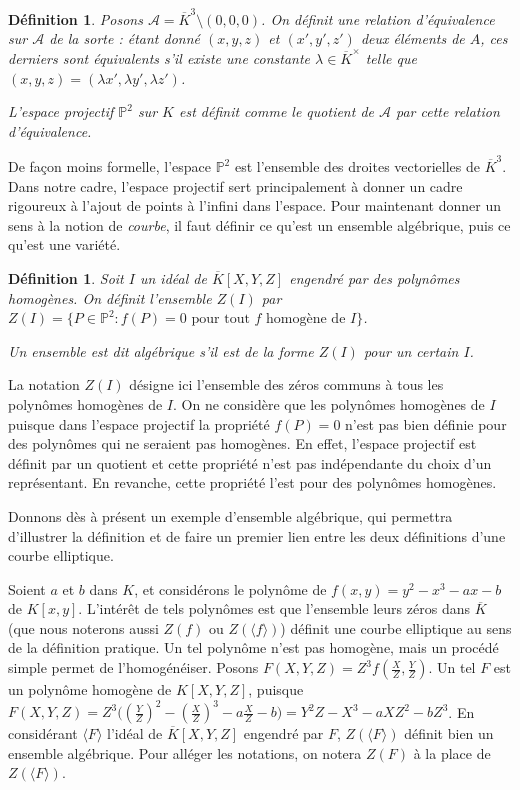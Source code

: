 \documentclass{article}
\theoremstyle{plain}%
\newtheorem{deff}[thm]{Définition}
\theoremstyle{definition}%
\newcommand{\ol}{\overline}
\begin{document}
\begin{deff}
  Posons $\mathcal{A} = \ol K^3\setminus(0, 0, 0)$. On définit une relation d'équivalence sur $\mathcal A$ de la sorte : étant donné $(x, y, z)$ et $(x', y', z')$ deux éléments de $A$, ces derniers sont équivalents s'il existe une constante $\lambda\in\ol K^\times$ telle que $(x, y, z) = (\lambda x', \lambda y', \lambda z')$.

  L'espace projectif $\mathbb P^2$ sur $K$ est définit comme le quotient de $\mathcal A$ par cette relation d'équivalence. 
\end{deff}

De façon moins formelle, l'espace $\mathbb P^2$ est l'ensemble des droites vectorielles de $\ol K^3$. Dans notre cadre, l'espace projectif sert principalement à donner un cadre rigoureux à l'ajout de points à l'infini dans l'espace. Pour maintenant donner un sens à la notion de \emph{courbe}, il faut définir ce qu'est un ensemble algébrique, puis ce qu'est une variété.

\begin{deff}
  Soit $I$ un idéal de $\ol K[X, Y, Z]$ engendré par des polynômes homogènes. On définit l'ensemble $Z(I)$ par $Z(I) = \{ P\in \mathbb{P}^2 : f(P) = 0 \text{ pour tout } f \text{ homogène de } I \}$.

  Un ensemble est dit algébrique s'il est de la forme $Z(I)$ pour un certain $I$.
\end{deff}

La notation $Z(I)$ désigne ici l'ensemble des zéros communs à tous les polynômes homogènes de $I$. On ne considère que les polynômes homogènes de $I$ puisque dans l'espace projectif la propriété $f(P) = 0$ n'est pas bien définie pour des polynômes qui ne seraient pas homogènes. 
En effet, l'espace projectif est définit par un quotient et cette propriété n'est pas indépendante du choix d'un représentant. En revanche, cette propriété l'est pour des polynômes homogènes.

Donnons dès à présent un exemple d'ensemble algébrique, qui permettra d'illustrer la définition et de faire un premier lien entre les deux définitions d'une courbe elliptique.

Soient $a$ et $b$ dans $K$, et considérons le polynôme de $f(x, y) = y^2 -x^3 -ax -b$ de $K[x, y]$. 
L'intérêt de tels polynômes est que l'ensemble leurs zéros dans $\ol K$ (que nous noterons aussi $Z(f)$ ou $Z(\langle f \rangle)$) définit une courbe elliptique au sens de la définition pratique.  
Un tel polynôme n'est pas homogène, mais un procédé simple permet de l'homogénéiser. 
Posons $F(X, Y, Z) = Z^3f(\frac{X}{Z}, \frac{Y}{Z})$. 
Un tel $F$ est un polynôme homogène de $K[X, Y, Z]$, puisque $F(X, Y, Z) = Z^3\big((\frac{Y}{Z})^2 - (\frac{X}{Z})^3 -a\frac{X}{Z}-b\big) = Y^2Z - X^3 -aXZ^2 -bZ^3$. 
En considérant $\langle F \rangle$ l'idéal de $\ol K[X, Y, Z]$ engendré par $F$, $Z(\langle F \rangle)$ définit bien un ensemble algébrique. Pour alléger les notations, on notera $Z(F)$ à la place de $Z(\langle F\rangle)$. 
\end{document}
